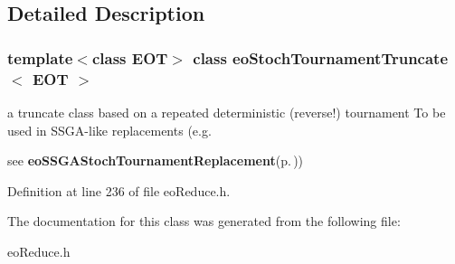 \subsection{Detailed Description}
\subsubsection*{template$<$class EOT$>$ class eo\-Stoch\-Tournament\-Truncate$<$ EOT $>$}

a truncate class based on a repeated deterministic (reverse!) tournament To be used in SSGA-like replacements (e.g. 

see {\bf eo\-SSGAStoch\-Tournament\-Replacement}{\rm (p.\,\pageref{classeo_s_s_g_a_stoch_tournament_replacement})}) 



Definition at line 236 of file eo\-Reduce.h.

The documentation for this class was generated from the following file:\begin{CompactItemize}
\item 
eo\-Reduce.h\end{CompactItemize}
